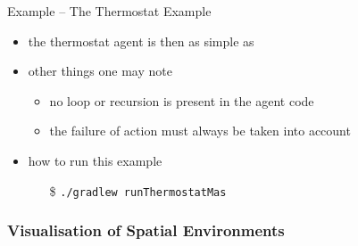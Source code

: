 \documentclass[presentation]{beamer}\mode<presentation>{\usetheme{AMSBolognaFC}}
\begin{document}
\begin{frame}[c, allowframebreaks]{Example \theJasonExample{} -- The Thermostat Example}
\begin{itemize}
    \framebreak
    
    \item the thermostat agent is then as simple as
    
    
    \framebreak
    
    \item other things one may note
    \begin{itemize}
        \item no loop or recursion is present in the agent code
        \item the failure of action must always be taken into account
    \end{itemize}
    
    \vspace{.3cm}
    
    \item how to run this example
    \begin{itemize}
        \item[\$] \texttt{./gradlew run\alert{Thermostat}Mas}
    \end{itemize}
    
\end{itemize}
\end{frame}

\subsubsection{Visualisation of Spatial Environments}
\end{document}
